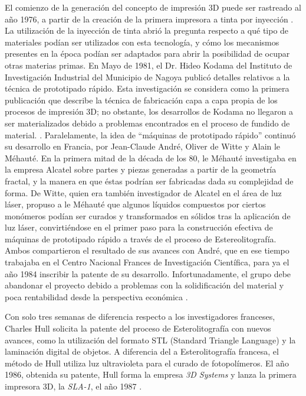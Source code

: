 El comienzo de la generación del concepto de impresión 3D puede ser rastreado al año 1976, a partir de la creación de la primera impresora a tinta por inyección \citep{maxey2013}. La utilización de la inyección de tinta abrió la pregunta respecto a qué tipo de materiales podían ser utilizados con esta tecnología, y cómo los mecanismos presentes en la época podían ser adaptados para abrir la posibilidad de ocupar otras materias primas. En Mayo de 1981, el Dr. Hideo Kodama del Instituto de Investigación Industrial del Municipio de Nagoya publicó detalles relativos a la técnica de prototipado rápido. Esta investigación se considera como la primera publicación que describe la técnica de fabricación capa a capa propia de los procesos de impresión 3D; no obstante, los desarrollos de Kodama no llegaron a ser materializados debido a problemas encontrados en el proceso de fundido de material. \citep{tresdsourced2020}. Paralelamente, la idea de ``máquinas de prototipado rápido'' continuó su desarrollo en Francia, por Jean-Claude André, Oliver de Witte y Alain le Méhauté. En la primera mitad de la década de los 80, le Méhauté investigaba en la empresa Alcatel sobre partes y piezas generadas a partir de la geometría fractal, y la manera en que éstas podrían ser fabricadas dada su complejidad de forma.
De Witte, quien era también investigador de Alcatel en el área de luz láser, propuso a le Méhauté que algunos líquidos compuestos por ciertos monómeros podían ser curados y transformados en sólidos tras la aplicación de luz láser, convirtiéndose en el primer paso para la construcción efectiva de máquinas de prototipado rápido a través de el proceso de Estereolitografía. Ambos compartieron el resultado de sus avances con André, que en ese tiempo trabajaba en el Centro Nacional Frances de Investigación Científica, para ya el año 1984 inscribir la patente de su desarrollo. Infortunadamente, el grupo debe abandonar el proyecto debido a problemas con la solidificación del material y poca rentabilidad desde la perspectiva económica \citep{alltresdp2018}.\

Con solo tres semanas de diferencia respecto a los investigadores franceses, Charles Hull solicita la patente del proceso de Esterolitografía con nuevos avances, como la utilización del formato STL (Standard Triangle Language) y la laminación digital de objetos. A diferencia del a Esterolitografía francesa, el método de Hull utiliza luz ultravioleta para el curado de fotopolímeros. El año 1986, obtenida su patente, Hull forma la empresa \textit{3D Systems} y lanza la primera impresora 3D, la \textit{SLA-1}, el año 1987 \citep{tresdsourced2020}.


